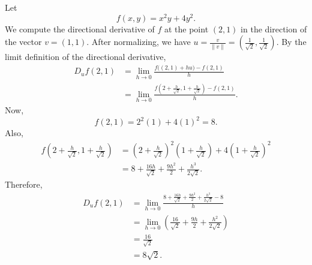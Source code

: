 	\begin{example}
	  \label{ex:directional-derivative-of-x2y4y2}
		Let
		\begin{equation}
			f(x,y) = x^2y + 4y^2.
		\end{equation}
		We compute the directional derivative of $f$ at the point $(2,1)$ in the direction of the vector $v = (1, 1)$. After normalizing, we have $u = \frac{v}{\|v\|} = \left(\frac{1}{\sqrt{2}}, \frac{1}{\sqrt{2}}\right)$. By the limit definition of the directional derivative,
		\begin{align}
			D_u f(2,1) & = \lim_{h\to 0} \frac{f\big((2,1)+hu\big)-f(2,1)}{h} \\
								 & = \lim_{h\to 0} \frac{ f\left(2+\frac{h}{\sqrt{2}}, 1+\frac{h}{\sqrt{2}}\right) - f(2,1) }{h}. 
		\end{align}
		Now,
		\begin{equation}
			f(2,1) = 2^2(1)+4(1)^2 = 8.
		\end{equation}
		Also,
		\begin{align}
			f\left(2+\frac{h}{\sqrt{2}}, 1+\frac{h}{\sqrt{2}}\right)
			&=
			\left(2+\frac{h}{\sqrt{2}}\right)^2
			\left(1+\frac{h}{\sqrt{2}}\right)
			+
			4\left(1+\frac{h}{\sqrt{2}}\right)^2 \\
			&=
			8 + \frac{16h}{\sqrt{2}} + \frac{9h^2}{2}
			+ \frac{h^3}{2\sqrt{2}}.
		\end{align}
		Therefore,
		\begin{align}
			D_u f(2,1)
			&=
			\lim_{h\to 0}
			\frac{
				8 + \frac{16h}{\sqrt{2}} + \frac{9h^2}{2}
				+ \frac{h^3}{2\sqrt{2}} - 8
			}{h} \\
			&=
			\lim_{h\to 0}
			\left(
				\frac{16}{\sqrt{2}} + \frac{9h}{2}
				+ \frac{h^2}{2\sqrt{2}}
			\right) \\
			&=
			\frac{16}{\sqrt{2}} \\
			&=
			8\sqrt{2}.
		\end{align}

		\begin{figure}[H]
			\centering
\end{figure}
\end{example}
